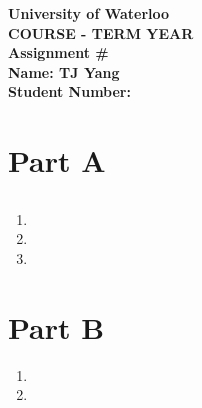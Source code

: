 \documentclass[12pt]{article}
\begin{document}
\begin{center}
{\Large\bf University of Waterloo}\\
\vspace{3mm}
{\Large\bf COURSE - TERM YEAR}\\
\vspace{2mm}
{\Large\bf Assignment #}\\
\vspace{3mm}
\textbf{Name: TJ Yang}\\
\textbf{Student Number:}
\end{center}

\section*{Part A}
\subsection{}
\begin{enumerate}[label=(\alph*)]
  \item
  \item
  \item
\end{enumerate}
\section*{Part B}
\begin{enumerate}
  \item
  \item
\end{enumerate}
\end{document}
